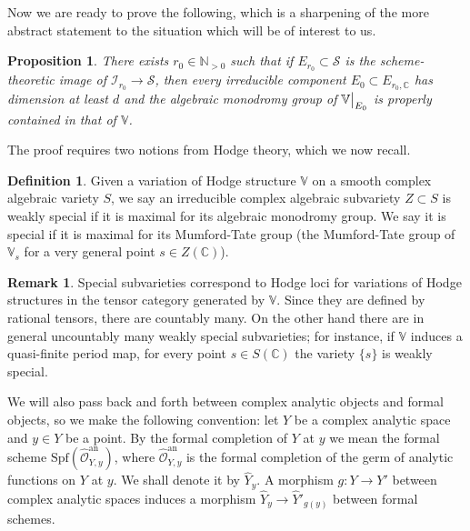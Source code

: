 \documentclass[letter, 11pt]{article}
\theoremstyle{plain}
\newtheorem{proposition}[subsubsection]{Proposition}
\theoremstyle{definition}
\newtheorem{definition}[subsubsection]{Definition}
\newtheorem{remark}[subsubsection]{Remark}
\newcommand{\IC}{\mathbb{C}}
\newcommand{\IN}{\mathbb{N}}
\newcommand{\IV}{\mathbb{V}}
\newcommand{\<}{\langle}
\renewcommand{\>}{\rangle}
\newcommand{\sI}{\mathcal{I}}
\newcommand{\sS}{\mathcal{S}}
\newcommand{\sO}{\mathcal{O}}
\newcommand{\Spf}{\mathrm{Spf}}
\newcommand\restr[2]{{
	\left.\kern-\nulldelimiterspace
	#1
	\vphantom{\big|}
	\right|_{#2}
	}}
\begin{document}
Now we are ready to prove the following, which is a sharpening of the more abstract statement \cite[Prop. 5.8]{urbanik2022algebraic} to the situation which will be of interest to us.

\begin{proposition}
\label{Econstrprop}
There exists $r_{0} \in \IN_{> 0}$ such that if $E_{r_0} \subset \sS$ is the scheme-theoretic image of $\sI_{r_{0}} \to \sS$, then every irreducible component $E_{0} \subset E_{r_0, \IC}$ has dimension at least $d$ and the algebraic monodromy group of $\restr{\IV}{E_{0}}$ is properly contained in that of $\IV$.
\end{proposition}

The proof requires two notions from Hodge theory, which we now recall.

\begin{definition}
Given a variation of Hodge structure $\IV$ on a smooth complex algebraic variety $S$, we say an irreducible complex algebraic subvariety $Z \subset S$ is weakly special if it is maximal for its algebraic monodromy group. We say it is special if it is maximal for its Mumford-Tate group (the Mumford-Tate group of $\IV_s$ for a very general point $s \in Z(\IC)$).
\end{definition}

\begin{remark}
Special subvarieties correspond to Hodge loci for variations of Hodge structures in the tensor category generated by $\IV$. Since they are defined by rational tensors, there are countably many. On the other hand there are in general uncountably many weakly special subvarieties; for instance, if $\IV$ induces a quasi-finite period map, for every point $s \in S(\IC)$ the variety $\{ s \}$ is weakly special.
\end{remark}

We will also pass back and forth between complex analytic objects and formal objects, so we make the following convention: let $Y$ be a complex analytic space and $y \in Y$ be a point. By the formal completion of $Y$ at $y$ we mean the formal scheme $\Spf(\hat{\sO}^{\mathrm{an}}_{Y, y})$, where $\hat{\sO}^{\mathrm{an}}_{Y, y}$ is the formal completion of the germ of analytic functions on $Y$ at $y$. We shall denote it by $\hat{Y}_y$. A morphism $g : Y \to Y'$ between complex analytic spaces induces a morphism $\hat{Y}_y \to \hat{Y}'_{g(y)}$ between formal schemes. 
\end{document}
